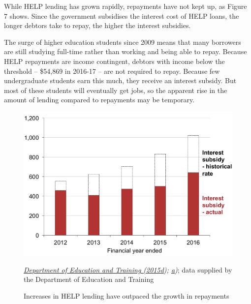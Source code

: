 \documentclass[embargoed]{grattan}
\begin{document}
While HELP lending has grown rapidly, repayments have not kept up, as Figure 7 shows.
Since the government subsidises the interest cost of HELP loans, the longer debtors take to repay, the higher the interest subsidies.

The surge of higher education students since 2009 means that many borrowers are still studying full-time rather than working and being able to repay.
Because HELP repayments are income contingent, debtors with income below the threshold -- \$54,869 in 2016-17 -- are not required to repay.
Because few undergraduate students earn this much, they receive an interest subsidy.
But most of these students will eventually get jobs, so the apparent rise in the amount of lending compared to repayments may be temporary.

\begin{figure}
\caption{Increases in HELP lending have outpaced the growth in repayments}\label{fig:fig7-increases-help-lending-outpaced-growth-repayments}


\includegraphics[page=7]{atlas/Chartpack.pdf}

%
{\emph{\protect\hyperlink{_ENREF_27}{Department of Education and Training (2015d}); \protect\hyperlink{_ENREF_24}{a})}; data supplied by the Department of Education and Training}
\end{figure}
\end{document}
